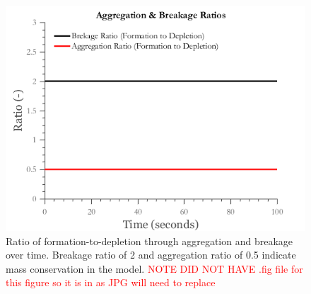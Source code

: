\documentclass[preprint,11pt,authoryear]{elsarticle}
\begin{document}
	
	      \begin{figure}[H]
	      \centering
	      \includegraphics[scale=0.5]{rslts_anik_pbm_ratios}
	      \caption{Ratio of formation-to-depletion through aggregation and breakage over time. Breakage ratio of 2 and aggregation ratio of 0.5 indicate mass conservation in the model. \textcolor{red}{NOTE DID NOT HAVE .fig file for this figure so it is in as JPG will need to replace} }
	      \label{fig:rslts_anik_pbm_ratios}
	      \end{figure}
	     
\end{document}
